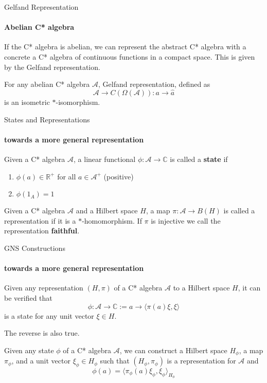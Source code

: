 \documentclass[dvipsnames]{beamer}
\newcommand{\1}{\mathds{1}}	%
\begin{document}
\begin{frame}{Gelfand Representation}
\framesubtitle{Abelian C* algebra}
If the C* algebra is abelian, we can represent the abstract C* algebra with a concrete a C* algebra of continuous functions in a compact space. \pause This is given by the Gelfand representation.
\pause

\begin{theorem}[Gelfand]
  For any abelian C* algebra $\mathcal{A}$, Gelfand representation, defined as $$\mathcal{A} \to C(\Omega(\mathcal{A})): a \to \hat{a}$$
  is an isometric $*$-isomorphism.
\end{theorem}
\end{frame}

\begin{frame}{States and Representations}
  \framesubtitle{towards a more general representation }
  \begin{definition}
    Given a C* algebra $\mathcal{A}$, a linear functional $\phi: \mathcal{A} \to \mathbb{C}$ is called a {\bf state} if \pause
    \begin{enumerate}
      \item $\phi(a) \in \mathbb{R}^+$ for all $a \in \mathcal{A}^+$ (positive) \pause
      \item $\phi(1_A) = 1$
    \end{enumerate}
  \end{definition}
  \pause
  \begin{definition}
    Given a C* algebra $\mathcal{A}$ and a Hilbert space $H$, a map $\pi: \mathcal{A} \to B(H)$ is called a representation if it is a $*$-homomorphism. \pause If $\pi$ is injective we call the representation {\bf faithful}.
  \end{definition}
\end{frame}

\begin{frame}{GNS Constructions}
  \framesubtitle{towards a more general representation }
  Given any representation $(H, \pi)$ of a C* algebra $\mathcal{A}$ to a Hilbert space $H$, it can be verified that $$\phi: \mathcal{A} \to \mathbb{C}:= a \to \langle \pi(a) \xi, \xi \rangle$$
  is a state for any unit vector $\xi \in H$.

  \pause

  The reverse is also true.

  \pause

  Given any state $\phi$ of a C* algebra $\mathcal{A}$, we can construct a Hilbert space $H_\phi$, a map $\pi_\phi$, and a unit vector $\xi_\phi \in H_\phi$ such that $(H_\phi, \pi_\phi)$ is a representation for $\mathcal{A}$ and $$\phi(a) = \langle \pi_\phi(a) \xi_\phi, \xi_\phi \rangle_{H_\phi}$$
\end{frame}
\end{document}
